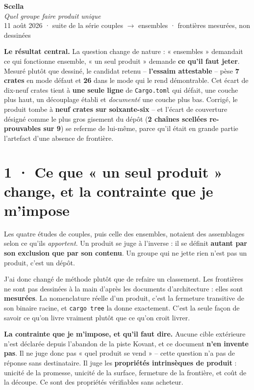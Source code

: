 \documentclass[10pt]{article}
\newcommand{\code}[1]{\texttt{\small #1}}
\begin{document}
\begin{center}
{\Huge\bfseries\color{navy} Scella}\\[4pt]
{\large\color{grey}\itshape Quel groupe faire produit unique}\\[4pt]
{\small\color{grey} 11 août 2026 \; · \; suite de la série couples $\rightarrow$ ensembles \; · \; frontières mesurées, non dessinées}
\end{center}
\vspace{2pt}

\begin{these}
\textbf{Le résultat central.} La question change de nature : « ensembles » demandait ce qui fonctionne
ensemble, « un seul produit » demande \textbf{ce qu'il faut jeter}. Mesuré plutôt que dessiné, le
candidat retenu -- \textbf{l'essaim attestable} -- pèse \textbf{7 crates} en mode défaut et
\textbf{26} dans le mode qui le rend démontrable. Cet écart de dix-neuf crates tient à \textbf{une
seule ligne} de \code{Cargo.toml} qui défait, une couche plus haut, un découplage établi et
\emph{documenté} une couche plus bas. Corrigé, le produit tombe à \textbf{neuf crates sur soixante-six}
-- et l'écart de couverture désigné comme le plus gros gisement du dépôt (\textbf{2 chaînes scellées
re-prouvables sur 9}) se referme de lui-même, parce qu'il était en grande partie l'artefact d'une
absence de frontière.
\end{these}

\section{1 · Ce que « un seul produit » change, et la contrainte que je m'impose}

Les quatre études de couples, puis celle des ensembles, notaient des assemblages selon ce qu'ils
\emph{apportent}. Un produit se juge à l'inverse : il se définit \textbf{autant par son exclusion que
par son contenu}. Un groupe qui ne jette rien n'est pas un produit, c'est un dépôt.

J'ai donc changé de méthode plutôt que de refaire un classement. Les frontières ne sont pas dessinées à
la main d'après les documents d'architecture : elles sont \textbf{mesurées}. La nomenclature réelle
d'un produit, c'est la fermeture transitive de son binaire racine, et \code{cargo tree} la donne
exactement. C'est la seule façon de savoir ce qu'on livre vraiment plutôt que ce qu'on croit livrer.

\begin{alerte}
\textbf{La contrainte que je m'impose, et qu'il faut dire.} Aucune cible extérieure n'est déclarée
depuis l'abandon de la piste Kovant, et ce document \textbf{n'en invente pas}. Il ne juge donc pas
« quel produit se vend » -- cette question n'a pas de réponse sans destinataire. Il juge les
\textbf{propriétés intrinsèques de produit} : unicité de la promesse, unicité de la surface, fermeture
de la frontière, et coût de la découpe. Ce sont des propriétés vérifiables sans acheteur.
\end{alerte}
\end{document}
